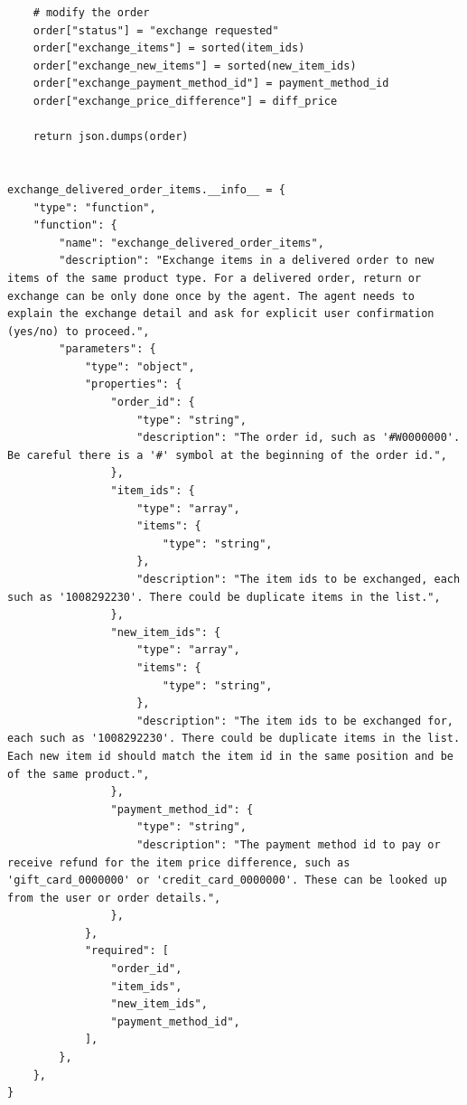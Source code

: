 \begin{verbatim}
    # modify the order
    order["status"] = "exchange requested"
    order["exchange_items"] = sorted(item_ids)
    order["exchange_new_items"] = sorted(new_item_ids)
    order["exchange_payment_method_id"] = payment_method_id
    order["exchange_price_difference"] = diff_price

    return json.dumps(order)


exchange_delivered_order_items.__info__ = {
    "type": "function",
    "function": {
        "name": "exchange_delivered_order_items",
        "description": "Exchange items in a delivered order to new items of the same product type. For a delivered order, return or exchange can be only done once by the agent. The agent needs to explain the exchange detail and ask for explicit user confirmation (yes/no) to proceed.",
        "parameters": {
            "type": "object",
            "properties": {
                "order_id": {
                    "type": "string",
                    "description": "The order id, such as '#W0000000'. Be careful there is a '#' symbol at the beginning of the order id.",
                },
                "item_ids": {
                    "type": "array",
                    "items": {
                        "type": "string",
                    },
                    "description": "The item ids to be exchanged, each such as '1008292230'. There could be duplicate items in the list.",
                },
                "new_item_ids": {
                    "type": "array",
                    "items": {
                        "type": "string",
                    },
                    "description": "The item ids to be exchanged for, each such as '1008292230'. There could be duplicate items in the list. Each new item id should match the item id in the same position and be of the same product.",
                },
                "payment_method_id": {
                    "type": "string",
                    "description": "The payment method id to pay or receive refund for the item price difference, such as 'gift_card_0000000' or 'credit_card_0000000'. These can be looked up from the user or order details.",
                },
            },
            "required": [
                "order_id",
                "item_ids",
                "new_item_ids",
                "payment_method_id",
            ],
        },
    },
}
\end{verbatim}

